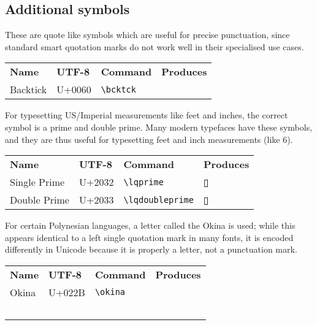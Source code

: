 \documentclass{article}
\newcommand{\primeback}{}
\newcommand{\thebox}{{\boxy ▯}}
\begin{document}
\subsection{Additional symbols}
These are quote like symbols which are useful for precise punctuation, since standard smart quotation marks do not work well in their specialised use cases.  


\begin{center}
\begin{longtable}{p{3cm}p{1.5cm}p{2cm}p{2.5cm}}
\textbf{Name} & \textbf{UTF-8} & \textbf{Command} & \textbf{Produces}\\
	Backtick & \ttfamily U+0060 & \verb!\bcktck! & \Huge\bcktck\thebox
\end{longtable}
		\end{center}
For typesetting US/Imperial measurements like feet and inches, the correct symbol is a prime and double prime.  Many modern typefaces have these symbols, and they are thus useful for typesetting feet and inch measurements (like 6\primeback\lqprime{}\primeback\lqdoubleprime ). 


\begin{center}
\begin{longtable}{p{3cm}p{1.5cm}p{2.4cm}p{2.5cm}}
\textbf{Name} & \textbf{UTF-8} & \textbf{Command} & \textbf{Produces}\\
	Single Prime & \ttfamily U+2032 & \verb!\lqprime! & \Huge\thebox\lqprime\\
		Double Prime & \ttfamily U+2033 & \verb!\lqdoubleprime! & \Huge\thebox\lqdoubleprime
\end{longtable}
		\end{center}





For certain Polynesian languages, a letter called the \okina Okina is used; while this appears identical to a left single quotation mark in many fonts, it is encoded differently in Unicode because it is properly a letter, not a punctuation mark. 

	
	
	
	\begin{center}
\begin{longtable}{p{3cm}p{1.5cm}p{2cm}p{2.5cm}}
\textbf{Name} & \textbf{UTF-8} & \textbf{Command} & \textbf{Produces}\\
	Okina & \ttfamily U+022B & \verb!\okina! & \Huge\okina\thebox\\\


\end{longtable}
\end{center}
	
\end{document}

